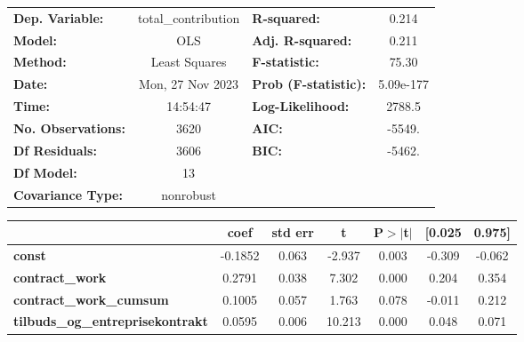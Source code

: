 \begin{center}
\begin{tabular}{lclc}
\toprule
\textbf{Dep. Variable:}                  & total\_contribution & \textbf{  R-squared:         } &     0.214   \\
\textbf{Model:}                          &         OLS         & \textbf{  Adj. R-squared:    } &     0.211   \\
\textbf{Method:}                         &    Least Squares    & \textbf{  F-statistic:       } &     75.30   \\
\textbf{Date:}                           &   Mon, 27 Nov 2023  & \textbf{  Prob (F-statistic):} & 5.09e-177   \\
\textbf{Time:}                           &       14:54:47      & \textbf{  Log-Likelihood:    } &    2788.5   \\
\textbf{No. Observations:}               &          3620       & \textbf{  AIC:               } &    -5549.   \\
\textbf{Df Residuals:}                   &          3606       & \textbf{  BIC:               } &    -5462.   \\
\textbf{Df Model:}                       &            13       & \textbf{                     } &             \\
\textbf{Covariance Type:}                &      nonrobust      & \textbf{                     } &             \\
\bottomrule
\end{tabular}
\begin{tabular}{lcccccc}
                                         & \textbf{coef} & \textbf{std err} & \textbf{t} & \textbf{P$> |$t$|$} & \textbf{[0.025} & \textbf{0.975]}  \\
\midrule
\textbf{const}                           &      -0.1852  &        0.063     &    -2.937  &         0.003        &       -0.309    &       -0.062     \\
\textbf{contract\_work}                  &       0.2791  &        0.038     &     7.302  &         0.000        &        0.204    &        0.354     \\
\textbf{contract\_work\_cumsum}          &       0.1005  &        0.057     &     1.763  &         0.078        &       -0.011    &        0.212     \\
\textbf{tilbuds\_og\_entreprisekontrakt} &       0.0595  &        0.006     &    10.213  &         0.000        &        0.048    &        0.071     \\

\end{tabular}
\end{center}
